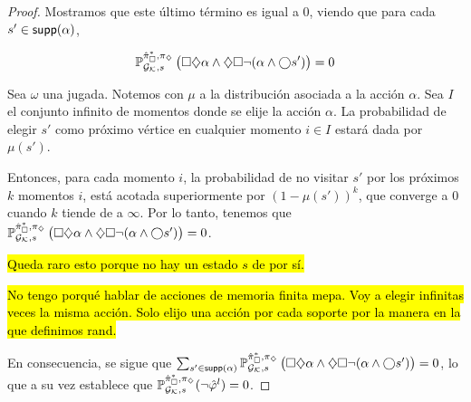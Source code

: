\begin{proof}
	Mostramos que este último término es igual a 0, viendo que para cada $s' \in
		\textsf{supp}(\alpha)$,

	$$
		\mathbb{P}_{\mathcal{G}_{\mathcal{K}}, s}^{\hat{\pi}_{\square}^{*}, \pi_\diamondsuit} \left( \square \diamondsuit \alpha \wedge \diamondsuit \square \neg (\alpha \wedge \bigcirc s' ) \right) = 0
	$$

	Sea $\omega$ una jugada. Notemos con $\mu$ a la distribución asociada a la
	acción $\alpha$. Sea $I$ el conjunto infinito de momentos donde se elije la
	acción $\alpha$. La probabilidad de elegir $s'$ como próximo vértice en
	cualquier momento $i \in I$ estará dada por $\mu(s')$.

	Entonces, para cada momento $i$, la probabilidad de no visitar $s'$ por los
	próximos $k$ momentos $i$, está acotada superiormente por $(1 - \mu(s'))^k$,
	que converge a $0$ cuando $k$ tiende de a $\infty$. Por lo tanto, tenemos que
	$\mathbb{P}_{\mathcal{G}_{\mathcal{K}}, s}^{\hat{\pi}_{\square}^{*}, \pi_\diamondsuit} \left( \square \diamondsuit \alpha \wedge
		\diamondsuit \square \neg (\alpha \wedge \bigcirc s' ) \right) = 0$.

	\hl{Queda raro esto porque no hay un estado $s$ de por sí.}


	\hl{No tengo porqué hablar de acciones de memoria finita mepa. Voy a elegir infinitas veces la misma acción. Solo elijo una acción por cada soporte por la manera en la que definimos rand.}


	En consecuencia, se sigue que $\sum_{s' \in \textsf{supp}(\alpha)} \mathbb{P}_{\mathcal{G}_{\mathcal{K}},
			s}^{\hat{\pi}_{\square}^{*}, \pi_\diamondsuit} \left( \square \diamondsuit \alpha \wedge \diamondsuit \square \neg
			(\alpha \wedge \bigcirc s' ) \right) = 0$, lo que a su vez establece que
	$\mathbb{P}_{\mathcal{G}_{\mathcal{K}}, s}^{\hat{\pi}_{\square}^{*}, \pi_\diamondsuit}(\neg \hat{\varphi}^l) = 0$.


\end{proof}
